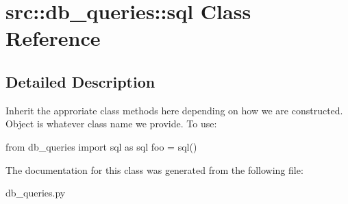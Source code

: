 \hypertarget{classsrc_1_1db__queries_1_1sql}{
\section{src::db\_\-queries::sql Class Reference}
\label{classsrc_1_1db__queries_1_1sql}
}


\subsection{Detailed Description}
\begin{DoxyVerb}Inherit the approriate class methods here depending on how
we are constructed.  Object is whatever class name we provide.
To use:

from db_queries import sql as sql
foo = sql()

\end{DoxyVerb}
 

The documentation for this class was generated from the following file:\begin{DoxyCompactItemize}
\item 
db\_\-queries.py\end{DoxyCompactItemize}
